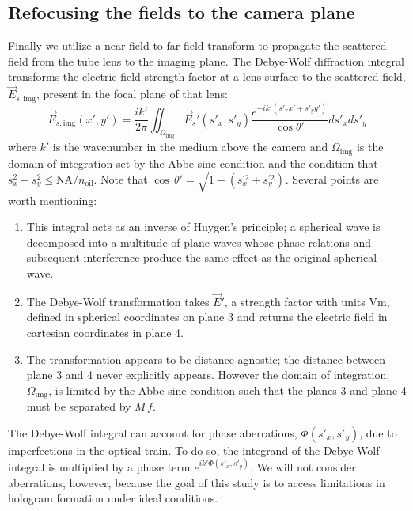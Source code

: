 \subsection{Refocusing the fields to the camera plane}
Finally we utilize a near-field-to-far-field transform to propagate the scattered
field from the tube lens to the imaging plane.
The Debye-Wolf diffraction integral transforms the electric field strength factor at a lens
surface to the scattered field, $\vec{E}_{s,\text{img}}$, present in the focal plane of that
lens:
\begin{equation}
  \vec{E}_{s,\text{img}}(x', y') = \frac{i k'}{2 \pi} \iint_{\Omega_{\text{img}}} \vec{E}_s'(s'_x, s'_y) \frac{e^{-ik'(s'_xx'+s'_yy')}}{\cos{\theta'}}ds'_xds'_y 
  \label{eq:debyewolf}
\end{equation}
where $k'$ is the wavenumber in the medium above the camera and $\Omega_{\text{img}}$
is the domain of integration set by the Abbe sine condition and the condition
that $s_x^2+s_y^2 \le \text{NA}/n_{\text{oil}}$. Note that $\cos \, \theta' = \sqrt{ 1 - (s_x^{\prime 2} + s_y^{\prime 2} )}$. Several points are worth mentioning:
\begin{enumerate}
\item This integral acts as an inverse of Huygen's principle; a spherical wave is
  decomposed into a multitude of plane waves whose phase relations and subsequent
  interference produce the same effect as the original spherical wave.
\item The Debye-Wolf transformation takes $\vec{E}'$, a strength factor with units
  $\si{\volt\meter}$, defined in spherical coordinates on plane \num{3} and
  returns the electric field  in cartesian coordinates in plane \num{4}.
\item The transformation appears to be distance agnostic; the distance
  between plane \num{3} and \num{4} never explicitly appears. However the domain
  of integration, $\Omega_{\text{img}}$, is limited by the Abbe sine condition
  such that the planes \num{3} and plane \num{4} must be separated by $M \, f$.
\end{enumerate}

The Debye-Wolf integral can account for phase aberrations, $\Phi(s'_x,s'_y)$,
due to imperfections in the optical train.
To do so, the integrand of the Debye-Wolf integral is multiplied by a phase term
$e^{ik'\Phi(s'_x,s'_y)}$. We will not consider aberrations, however, because
the goal of this study is to access limitations in hologram formation
under ideal conditions.

